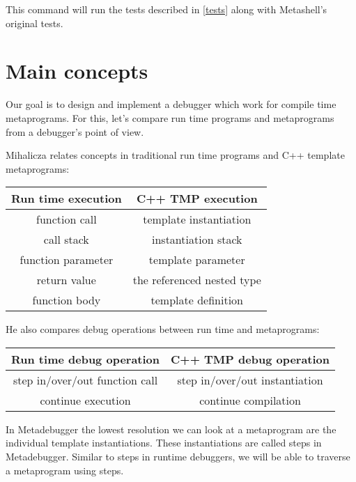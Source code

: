 This command will run the tests described in \ref{tests} along with Metashell's
original tests.

\section{Main concepts}

Our goal is to design and implement a debugger which work for compile time
metaprograms. For this, let's compare run time programs and metaprograms from a
debugger's point of view.

Mihalicza relates concepts in traditional run time programs and C++ template
metaprograms\cite{mihalicza-phd}:

\begin{center}
    \begin{tabular}{| c | c |}
        \hline
        Run time execution & C++ TMP execution \\ \hline \hline
        function call & template instantiation \\ \hline
        call stack & instantiation stack \\ \hline
        function parameter & template parameter \\ \hline
        return value & the referenced nested type \\ \hline
        function body & template definition \\ \hline
    \end{tabular}
\end{center}

He also compares debug operations between run time and metaprograms:

\begin{center}
    \begin{tabular}{| c | c |}
        \hline
        Run time debug operation & C++ TMP debug operation \\ \hline \hline
        step in/over/out function call & step in/over/out instantiation \\ \hline
        continue execution & continue compilation \\ \hline
    \end{tabular}
\end{center}

In Metadebugger the lowest resolution we can look at a metaprogram are the
individual template instantiations. These instantiations are called steps in
Metadebugger. Similar to steps in runtime debuggers, we will be able to
traverse a metaprogram using steps.


